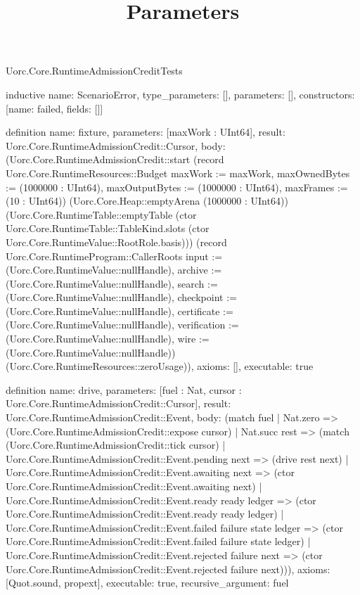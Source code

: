 \begin{lexlean}{Uorc.Core.RuntimeAdmissionCreditTests}
\title{Parameters}
\begin{semanticmodule}
inductive{
  name: ScenarioError,
  type_parameters: [],
  parameters: [],
  constructors: [{name: failed, fields: []}]
}

definition{
  name: fixture,
  parameters: [maxWork : UInt64],
  result: Uorc.Core.RuntimeAdmissionCredit::Cursor,
  body: (Uorc.Core.RuntimeAdmissionCredit::start (record Uorc.Core.RuntimeResources::Budget {maxWork := maxWork, maxOwnedBytes := (1000000 : UInt64), maxOutputBytes := (1000000 : UInt64), maxFrames := (10 : UInt64)}) (Uorc.Core.Heap::emptyArena (1000000 : UInt64)) (Uorc.Core.RuntimeTable::emptyTable (ctor Uorc.Core.RuntimeTable::TableKind.slots (ctor Uorc.Core.RuntimeValue::RootRole.basis))) (record Uorc.Core.RuntimeProgram::CallerRoots {input := (Uorc.Core.RuntimeValue::nullHandle), archive := (Uorc.Core.RuntimeValue::nullHandle), search := (Uorc.Core.RuntimeValue::nullHandle), checkpoint := (Uorc.Core.RuntimeValue::nullHandle), certificate := (Uorc.Core.RuntimeValue::nullHandle), verification := (Uorc.Core.RuntimeValue::nullHandle), wire := (Uorc.Core.RuntimeValue::nullHandle)}) (Uorc.Core.RuntimeResources::zeroUsage)),
  axioms: [],
  executable: true
}

definition{
  name: drive,
  parameters: [fuel : Nat, cursor : Uorc.Core.RuntimeAdmissionCredit::Cursor],
  result: Uorc.Core.RuntimeAdmissionCredit::Event,
  body: (match fuel
    | Nat.zero => (Uorc.Core.RuntimeAdmissionCredit::expose cursor)
    | Nat.succ rest => (match (Uorc.Core.RuntimeAdmissionCredit::tick cursor)
      | Uorc.Core.RuntimeAdmissionCredit::Event.pending next => (drive rest next)
      | Uorc.Core.RuntimeAdmissionCredit::Event.awaiting next => (ctor Uorc.Core.RuntimeAdmissionCredit::Event.awaiting next)
      | Uorc.Core.RuntimeAdmissionCredit::Event.ready ready ledger => (ctor Uorc.Core.RuntimeAdmissionCredit::Event.ready ready ledger)
      | Uorc.Core.RuntimeAdmissionCredit::Event.failed failure state ledger => (ctor Uorc.Core.RuntimeAdmissionCredit::Event.failed failure state ledger)
      | Uorc.Core.RuntimeAdmissionCredit::Event.rejected failure next => (ctor Uorc.Core.RuntimeAdmissionCredit::Event.rejected failure next))),
  axioms: [Quot.sound, propext],
  executable: true,
  recursive_argument: fuel
}


\end{semanticmodule}
\end{lexlean}
